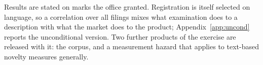 \documentclass[11pt]{article}
\begin{document}
Results are stated on marks the office granted. Registration is itself
selected on language, so a correlation over all filings mixes what
examination does to a description with what the market does to the product;
Appendix~\ref{app:uncond} reports the unconditional version. Two further
products of the exercise are released with it: the corpus, and a
measurement hazard that applies to text-based novelty measures generally.
\end{document}

